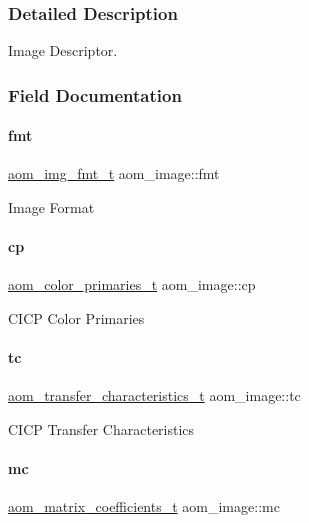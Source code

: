 \subsubsection{Detailed Description}
Image Descriptor. 

\subsubsection{Field Documentation}
\mbox{\label{structaom__image_a6c64b1ab918d80d52eb8f5d6d957e825}} 
\paragraph{\texorpdfstring{fmt}{fmt}}
{\footnotesize\ttfamily \hyperlink{aom__image_8h_ab71efff8c7f49380fad23b93bc2e9bfc}{aom\+\_\+img\+\_\+fmt\+\_\+t} aom\+\_\+image\+::fmt}

Image Format \mbox{\label{structaom__image_aeff339c4b3d37ce2528bce37418bdaa6}} 
\paragraph{\texorpdfstring{cp}{cp}}
{\footnotesize\ttfamily \hyperlink{aom__image_8h_ad72aacc083639c415fe2b4a12ea2e9e9}{aom\+\_\+color\+\_\+primaries\+\_\+t} aom\+\_\+image\+::cp}

C\+I\+CP Color Primaries \mbox{\label{structaom__image_aa7f7bf00699076f824460be08a0e1e65}} 
\paragraph{\texorpdfstring{tc}{tc}}
{\footnotesize\ttfamily \hyperlink{aom__image_8h_aad2d14d16ce5f24c6225f716a0a30563}{aom\+\_\+transfer\+\_\+characteristics\+\_\+t} aom\+\_\+image\+::tc}

C\+I\+CP Transfer Characteristics \mbox{\label{structaom__image_a47c4dda09afa07d6eb0dd0de8cd31838}} 
\paragraph{\texorpdfstring{mc}{mc}}
{\footnotesize\ttfamily \hyperlink{aom__image_8h_a9994d1b5fe7cc98d54b26859d610a1cc}{aom\+\_\+matrix\+\_\+coefficients\+\_\+t} aom\+\_\+image\+::mc}

